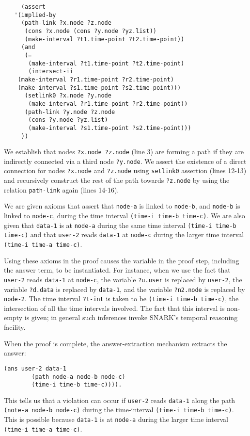 \begin{lstlisting}
     (assert
   '(implied-by
     (path-link ?x.node ?z.node
      (cons ?x.node (cons ?y.node ?yz.list))
      (make-interval ?t1.time-point ?t2.time-point))
     (and
      (=
       (make-interval ?t1.time-point ?t2.time-point)
       (intersect-ii
	(make-interval ?r1.time-point ?r2.time-point)
	(make-interval ?s1.time-point ?s2.time-point)))
      (setlink0 ?x.node ?y.node
       (make-interval ?r1.time-point ?r2.time-point))
      (path-link ?y.node ?z.node
       (cons ?y.node ?yz.list)
       (make-interval ?s1.time-point ?s2.time-point)))
     ))
\end{lstlisting}

We establish that nodes \verb'?x.node ?z.node' (line 3) are forming a path if they are indirectly connected via a third node \verb'?y.node'. We assert the existence of a direct connection for nodes \verb'?x.node' and \verb'?z.node' using \verb'setlink0' assertion (lines 12-13) and recursively construct the rest of the path towards \verb'?z.node' by using the relation \verb'path-link' again (lines 14-16).

We are given axioms that assert that \verb'node-a' is linked to \verb'node-b', and \verb'node-b' is linked to \verb'node-c', during the time interval \verb'(time-i time-b time-c)'. We are also given that \verb'data-1' is at \verb'node-a' during the same time interval 
\verb'(time-i time-b time-c)' and that \verb'user-2' reads \verb'data-1' at \verb'node-c' during the larger time interval \verb'(time-i time-a time-c)'.  

Using these axioms in the proof causes the variable in the proof step, including the answer term, to be instantiated.  
For instance, when we use the fact that \verb'user-2' reads \verb'data-1' at \verb'node-c', the variable \verb'?u.user' is replaced by \verb'user-2', the variable \verb'?d.data' is replaced by \verb'data-1', and the variable \verb'?n2.node' is replaced by \verb'node-2'.  
The time interval \verb'?t-int' is taken to be \verb'(time-i time-b time-c)', the intersection of all the time intervals involved. The fact that this interval is non-empty is given; in general such inferences invoke SNARK's temporal reasoning facility. 

When the proof is complete, the answer-extraction mechanism extracts the answer:
\begin{lstlisting}[numbers=none]
   (ans user-2 data-1 
        (path node-a node-b node-c)
        (time-i time-b time-c)))).
\end{lstlisting} 
This tells us that a violation can occur if \verb'user-2' reads \verb'data-1' along the path \verb'(note-a node-b node-c)' during the time-interval \verb'(time-i time-b time-c)'. 
This is possible because \verb'data-1' is at \verb'node-a' during the larger time interval 
\verb'(time-i time-a time-c)'.

